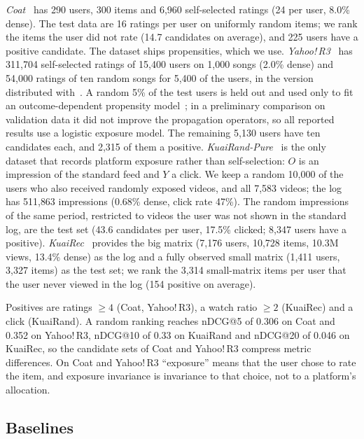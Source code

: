 \emph{Coat}~\citep{schnabel2016} has 290 users, 300 items and 6{,}960
self-selected ratings (24 per user, 8.0\% dense). The test data are 16 ratings per
user on uniformly random items; we rank the items the user did not rate (14.7
candidates on average), and 225 users have a positive candidate. The dataset
ships propensities, which we use.
\emph{Yahoo!\,R3}~\citep{marlin2009collaborative} has 311{,}704 self-selected
ratings of 15{,}400 users on 1{,}000 songs (2.0\% dense) and 54{,}000 ratings of
ten random songs for 5{,}400 of the users, in the version distributed
with~\citep{chen2021autodebias}. A random 5\% of the test users is held out and
used only to fit an outcome-dependent propensity model~\citep{schnabel2016}; in a
preliminary comparison on validation data it did not improve the propagation
operators, so all reported results use a logistic exposure model. The remaining 5{,}130 users have ten
candidates each, and 2{,}315 of them a positive.
\emph{KuaiRand-Pure}~\citep{gao2022kuairand} is the only dataset that records
platform exposure rather than self-selection: $O$ is an impression of the
standard feed and $Y$ a click. We keep a random 10{,}000 of the users who also
received randomly exposed videos, and all 7{,}583 videos; the log has 511{,}863
impressions (0.68\% dense, click rate 47\%). The random impressions of the same
period, restricted to videos the user was not shown in the standard log, are the
test set (43.6 candidates per user, 17.5\% clicked; 8{,}347 users have a
positive). \emph{KuaiRec}~\citep{gao2022kuairec} provides the big matrix (7{,}176
users, 10{,}728 items, 10.3M views, 13.4\% dense) as the log and a fully observed
small matrix (1{,}411 users, 3{,}327 items) as the test set; we rank the 3{,}314
small-matrix items per user that the user never viewed in the log (154 positive
on average).

Positives are ratings $\ge4$ (Coat, Yahoo!\,R3), a watch ratio $\ge2$ (KuaiRec)
and a click (KuaiRand). A random ranking reaches nDCG@5 of 0.306 on Coat and
0.352 on Yahoo!\,R3, nDCG@10 of 0.33 on KuaiRand and nDCG@20 of 0.046 on
KuaiRec, so the candidate sets of Coat and Yahoo!\,R3 compress metric differences.
On Coat and Yahoo!\,R3 ``exposure'' means that the user chose to rate the item,
and exposure invariance is invariance to that choice, not to a platform's
allocation.

\subsection{Baselines}\label{sec:baselines}


